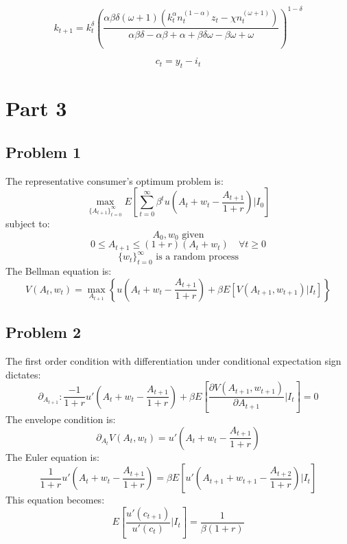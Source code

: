 \documentclass{article}
\begin{document}
\begin{equation}
    k_{t+1} = k_t^{\delta} \left(\frac{{\alpha  \beta  \delta  (\omega + 1)  (k_t^{\alpha}  n_t^{(1 - \alpha)}  z_t - \chi  n_t^{(\omega + 1)})}}{{\alpha  \beta  \delta  - \alpha  \beta + \alpha + \beta  \delta  \omega - \beta  \omega + \omega}}\right)^{1-\delta}
\end{equation}

\begin{equation}
    c_t = y_t - i_t
\end{equation}

\section{Part 3}

\subsection{Problem 1}
The representative consumer’s optimum problem is:
\[
    \max_{\{A_{t+1}\}_{t=0}^{\infty}} E\left[\sum_{t=0}^{\infty} \beta^t u(A_t + w_t - \frac{A_{t+1}}{1+r}) | I_0 \right]
\]
subject to:
\[
    A_0, w_0 \text{ given}    
\]
\[
    0 \leq A_{t+1} \leq  (1+r)(A_t + w_t) \quad \forall t \geq 0
\]
\[
    \{w_t\}_{t=0}^{\infty} \text{ is a random process}    
\]
The Bellman equation is:
\[
    V(A_t, w_t) = \max_{A_{t+1}} \left\{ u(A_t + w_t - \frac{A_{t+1}}{1+r}) + \beta E[V(A_{t+1}, w_{t+1}) | I_t] \right\}
\]
\subsection{Problem 2}
The first order condition with differentiation under conditional expectation sign dictates:
\begin{equation}
    \partial_{A_{t+1}} : \frac{-1}{1+r}u'(A_t + w_t - \frac{A_{t+1}}{1+r}) + \beta E\left[\frac{\partial V(A_{t+1}, w_{t+1})}{\partial A_{t+1}} | I_t\right] = 0
\end{equation}
The envelope condition is:
\begin{equation}
    \partial_{A_t} V(A_t, w_t) = u'(A_t + w_t - \frac{A_{t+1}}{1+r})
\end{equation}
The Euler equation is:
\begin{equation}
    \frac{1}{1+r}u'(A_t + w_t - \frac{A_{t+1}}{1+r}) = \beta E\left[u'(A_{t+1} + w_{t+1} - \frac{A_{t+2}}{1+r}) | I_t\right]
\end{equation}
This equation becomes:
\begin{equation}
    E\left[\frac{u'(c_{t+1})}{u'(c_t)} | I_t\right] = \frac{1}{\beta (1+r)}
\end{equation}
\end{document}
